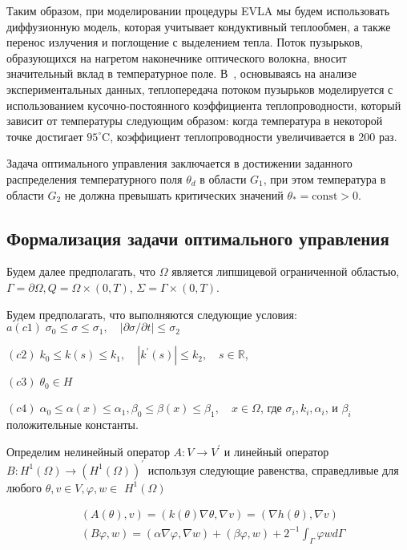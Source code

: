 Таким образом, при моделировании процедуры EVLA мы будем использовать
диффузионную модель, которая учитывает кондуктивный теплообмен,
а также перенос излучения и поглощение с выделением тепла.
Поток пузырьков, образующихся на нагретом наконечнике оптического волокна,
вносит значительный вклад в температурное поле.
В~\cite{Opticalthermal_vanRuijven2014, Some_Poluektova2014, Endovenous_Malskat2014},
основываясь на анализе экспериментальных данных,
теплопередача потоком пузырьков моделируется с использованием кусочно-постоянного
коэффициента теплопроводности, который зависит от температуры следующим образом:
когда температура в некоторой точке достигает $95 ^ {\circ} \mathrm{C}$,
коэффициент теплопроводности увеличивается в 200 раз.

Задача оптимального управления заключается в достижении заданного распределения
температурного поля $\theta_{d}$ в области $G_{1}$, при этом температура в области
$G_{2}$ не должна превышать критических значений $\theta_{*}=\text{const}>0$.

\subsection{Формализация задачи оптимального управления}
\label{subsec:ch3:sec2:subsec2}

Будем далее предполагать, что $\Omega$ является липшицевой ограниченной областью,
$\Gamma=\partial \Omega, Q=\Omega \times(0, T)$, $\Sigma=\Gamma \times(0, T)$.

Будем предполагать, что выполняются следующие условия:
$a(c1)\; \sigma_{0} \leq \sigma \leq \sigma_{1},
\quad|\partial \sigma / \partial t| \leq \sigma_{2}$

$(c2)\; k_{0} \leq k(s) \leq k_{1}, \quad\left|k^{\prime}(s)\right| \leq k_{2},
\quad s \in \mathbb{R}$,

$(c3)\; \theta_{0} \in H$

$(c4)\; \alpha_{0} \leq \alpha(x) \leq \alpha_{1},
\beta_{0} \leq \beta(x) \leq \beta_{1}, \quad x \in \Omega$,
где $\sigma_{i}, k_{i}, \alpha_{i}$, и $\beta_{i}$ положительные константы.

Определим нелинейный оператор $A: V \rightarrow V^{\prime}$ и линейный оператор
$B: H^{1}(\Omega) \rightarrow\left(H^{1}(\Omega)\right)^{\prime}$
используя следующие равенства, справедливые для любого
$\theta, v \in V, \varphi, w \in$ $H^{1}(\Omega)$

\[
    \begin{aligned}
        &(A(\theta), v)=(k(\theta) \nabla \theta, \nabla v)=(\nabla h(\theta), \nabla v) \\
        &(B \varphi, w)=(\alpha \nabla \varphi, \nabla w)+(\beta \varphi, w)+2^{-1}
        \int_{\Gamma} \varphi w d \Gamma
    \end{aligned}
\]

